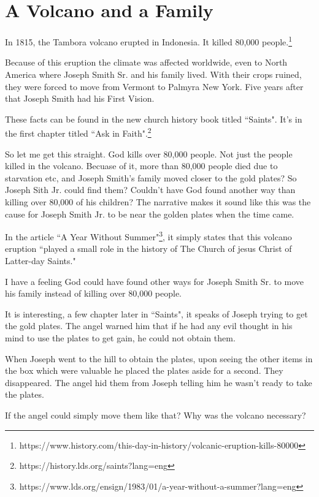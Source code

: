 \chapter{A Volcano and a Family}

In 1815, the Tambora volcano erupted in Indonesia. It killed 80,000 people.\footnote{
https://www.history.com/this-day-in-history/volcanic-eruption-kills-80000
}

Because of this eruption the climate was affected worldwide, even to North America
where Joseph Smith Sr. and his family lived. With their crops ruined, they were
forced to move from Vermont to Palmyra New York. Five years after that Joseph Smith
had his First Vision.

These facts can be found in the new church history book titled ``Saints". It's in the
first chapter titled ``Ask in Faith".\footnote{https://history.lds.org/saints?lang=eng}

So let me get this straight. God kills over 80,000 people. Not just the people killed
in the volcano. Becuase of it, more than 80,000 people died due to starvation etc,
and Joseph Smith's family moved closer to the gold plates? So Joseph Sith Jr. could
find them? Couldn't have God found another way than killing over 80,000 of his
children? The narrative makes it sound like this was the cause for Joseph Smith Jr.
to be near the golden plates when the time came.

In the article ``A Year Without Summer"\footnote{
https://www.lds.org/ensign/1983/01/a-year-without-a-summer?lang=eng}, it simply
states that this volcano eruption ``played a small role in the history of The Church
of jesus Christ of Latter-day Saints."

I have a feeling God could have found other ways for Joseph Smith Sr. to move his
family instead of killing over 80,000 people.

It is interesting, a few chapter later in ``Saints", it speaks of Joseph trying to
get the gold plates. The angel warned him that if he had any evil thought in his mind
to use the plates to get gain, he could not obtain them.

When Joseph went to the hill to obtain the plates, upon seeing the other items in the
box which were valuable he placed the plates aside for a second. They disappeared.
The angel hid them from Joseph telling him he wasn't ready to take the plates.

If the angel could simply move them like that? Why was the volcano necessary?